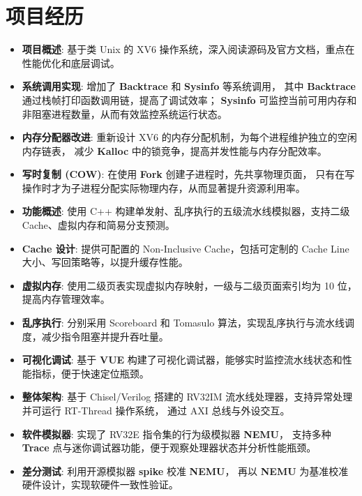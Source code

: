 \documentclass{resume}
\begin{document}

\section{项目经历}
\begin{itemize}[leftmargin=*]
    \item \textbf{项目概述}: 基于类 Unix 的 XV6 操作系统，深入阅读源码及官方文档，重点在性能优化和底层调试。  
    \item \textbf{系统调用实现}: 增加了 \textbf{Backtrace} 和 \textbf{Sysinfo} 等系统调用，
    其中 \textbf{Backtrace} 通过栈帧打印函数调用链，提高了调试效率；
    \textbf{Sysinfo} 可监控当前可用内存和非阻塞进程数量，从而有效监控系统运行状态。
    \item \textbf{内存分配器改进}: 重新设计 XV6 的内存分配机制，为每个进程维护独立的空闲内存链表，
    减少 \textbf{Kalloc} 中的锁竞争，提高并发性能与内存分配效率。
    \item \textbf{写时复制 (COW)}: 在使用 \textbf{Fork} 创建子进程时，先共享物理页面，
    只有在写操作时才为子进程分配实际物理内存，从而显著提升资源利用率。
\end{itemize}

\begin{itemize}[leftmargin=*]
    \item \textbf{功能概述}: 使用 C++ 构建单发射、乱序执行的五级流水线模拟器，支持二级 Cache、虚拟内存和简易分支预测。
    \item \textbf{Cache 设计}: 提供可配置的 Non-Inclusive Cache，包括可定制的 Cache Line 大小、写回策略等，以提升缓存性能。
    \item \textbf{虚拟内存}: 使用二级页表实现虚拟内存映射，一级与二级页面索引均为 10 位，提高内存管理效率。
    \item \textbf{乱序执行}: 分别采用 Scoreboard 和 Tomasulo 算法，实现乱序执行与流水线调度，减少指令阻塞并提升吞吐量。
    \item \textbf{可视化调试}: 基于 \textbf{VUE} 构建了可视化调试器，能够实时监控流水线状态和性能指标，便于快速定位瓶颈。
\end{itemize}

\begin{itemize}[leftmargin=*]
    \item \textbf{整体架构}: 基于 Chisel/Verilog 搭建的 RV32IM 流水线处理器，支持异常处理并可运行 RT-Thread 操作系统，
    通过 AXI 总线与外设交互。
    \item \textbf{软件模拟器}: 实现了 RV32E 指令集的行为级模拟器 \textbf{NEMU}，
    支持多种 \textbf{Trace} 点与迷你调试器功能，便于观察处理器状态并分析性能瓶颈。
    \item \textbf{差分测试}: 利用开源模拟器 \textbf{spike} 校准 \textbf{NEMU}，
    再以 \textbf{NEMU} 为基准校准硬件设计，实现软硬件一致性验证。
\end{itemize}
\end{document}
